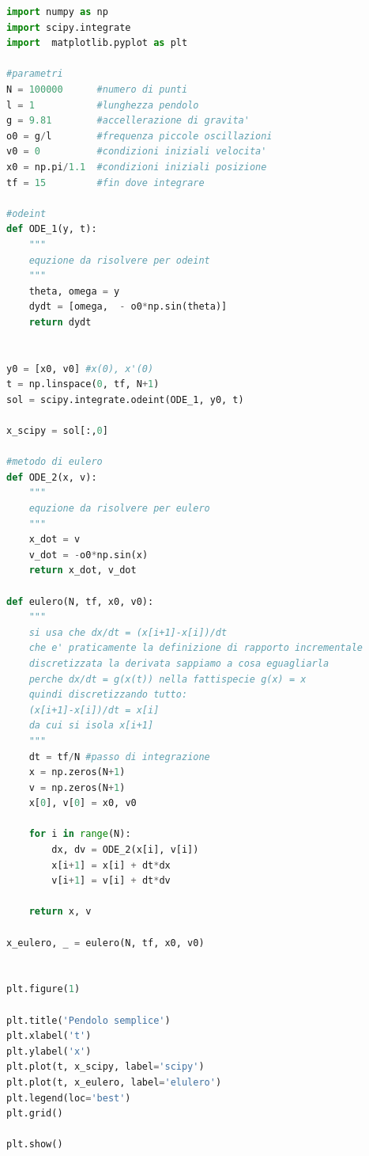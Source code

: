 \documentclass[10pt,a4paper]{article}
\begin{document}
\begin{lstlisting}[language=Python]
import numpy as np
import scipy.integrate
import  matplotlib.pyplot as plt

#parametri
N = 100000      #numero di punti
l = 1           #lunghezza pendolo
g = 9.81        #accellerazione di gravita'
o0 = g/l        #frequenza piccole oscillazioni
v0 = 0          #condizioni iniziali velocita'
x0 = np.pi/1.1	#condizioni iniziali posizione
tf = 15         #fin dove integrare

#odeint
def ODE_1(y, t):
    """
    equzione da risolvere per odeint
    """
    theta, omega = y
    dydt = [omega,  - o0*np.sin(theta)]
    return dydt
    
 
y0 = [x0, v0] #x(0), x'(0)
t = np.linspace(0, tf, N+1)
sol = scipy.integrate.odeint(ODE_1, y0, t)

x_scipy = sol[:,0]

#metodo di eulero
def ODE_2(x, v):
    """
    equzione da risolvere per eulero
    """
    x_dot = v
    v_dot = -o0*np.sin(x)
    return x_dot, v_dot
    
def eulero(N, tf, x0, v0):
    """
    si usa che dx/dt = (x[i+1]-x[i])/dt 
    che e' praticamente la definizione di rapporto incrementale
    discretizzata la derivata sappiamo a cosa eguagliarla
    perche dx/dt = g(x(t)) nella fattispecie g(x) = x
    quindi discretizzando tutto:
    (x[i+1]-x[i])/dt = x[i]
    da cui si isola x[i+1]
    """
    dt = tf/N #passo di integrazione
    x = np.zeros(N+1)
    v = np.zeros(N+1)
    x[0], v[0] = x0, v0
    
    for i in range(N):
        dx, dv = ODE_2(x[i], v[i])
        x[i+1] = x[i] + dt*dx
        v[i+1] = v[i] + dt*dv
        
    return x, v

x_eulero, _ = eulero(N, tf, x0, v0)


plt.figure(1)

plt.title('Pendolo semplice')
plt.xlabel('t')
plt.ylabel('x')
plt.plot(t, x_scipy, label='scipy')
plt.plot(t, x_eulero, label='elulero')
plt.legend(loc='best')
plt.grid()

plt.show()
\end{lstlisting}

\begin{center}
\end{center}
\end{document}

